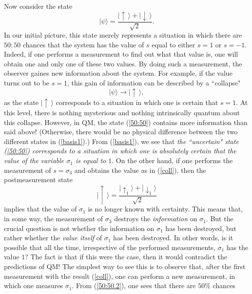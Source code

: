 \documentclass[12pt]{article}
\begin{document}
Now consider the state
\begin{equation}\label{50:50}
|\psi\rangle = \frac{
|\!\uparrow\,\rangle + |\!\downarrow\,\rangle }{\sqrt{2}} .
\end{equation}
In our initial picture, this state merely represents a situation 
in which there are $50:50$ chances that the system has the value of 
$s$ equal to either $s=1$ or $s=-1$. Indeed, 
if one performs a measurement to find out what that value 
is, one will obtain one and only one of these two values. 
By doing such a measurement, the observer gaines new information about 
the system. For example, if the value turns out to be $s=1$, this 
gain of information can be described by a ``collapse"
\begin{equation}\label{coll}
|\psi\rangle \rightarrow |\!\uparrow\,\rangle ,
\end{equation}
as the state $|\!\uparrow\,\rangle$ corresponds to a situation in which 
one is certain that $s=1$.
At this level, there is nothing mysterious and nothing intrinsically
quantum about this collapse. However, in QM, the state (\ref{50:50})
contains more information than said above! 
(Otherwise, there would be no 
physical difference between the two different states in   
(\ref{basis1}).) From (\ref{basis1}), we see that {\em the ``uncertain" state
(\ref{50:50}) corresponds to a situation in which one is absolutely certain 
that the value of the variable $\sigma_1$ is equal to $1$}. On the other
hand, if one performs the measurement of $s=\sigma_3$ and obtains 
the value as in (\ref{coll}), then 
the postmeasurement state
\begin{equation}\label{50:50.2}
|\!\uparrow\,\rangle = \displaystyle\frac{
|\!\uparrow_1\rangle + |\!\downarrow_1\rangle }{\sqrt{2}}
\end{equation}
implies that the value of $\sigma_1$ is no longer known with certainty.
This means that, in some way, the measurement of $\sigma_3$ destroys 
the {\em information} on $\sigma_1$. But the crucial question is
not whether the information on $\sigma_1$ has been destroyed, 
but rather whether the {\em value itself} of $\sigma_1$ has been destroyed. 
In other words, is it possible that all the time, 
irrespective of the performed measurements, $\sigma_1$ has the value $1$?
The fact is that if this were the case, then it would contradict 
the predictions of QM! The simplest way to see this is to observe 
that, after the first measurement with the result (\ref{coll}), 
one can perform a new measurement, in which one measures $\sigma_1$.
From (\ref{50:50.2}), one sees that there are $50\%$ chances 
\end{document}
